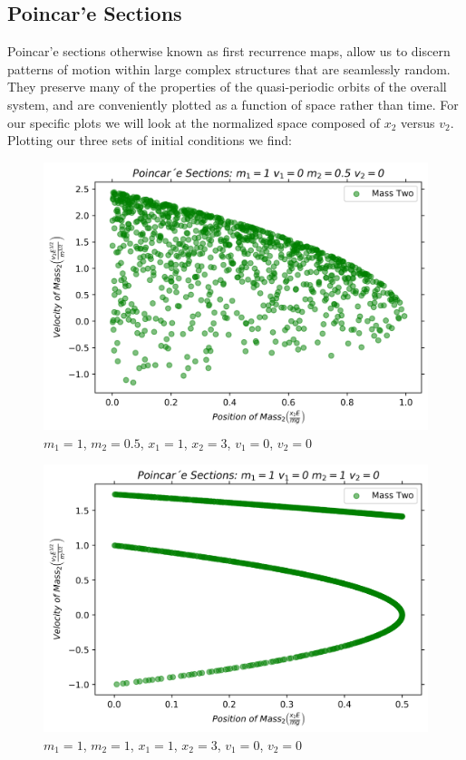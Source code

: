 \documentclass[twocolumn]{article}
\begin{document}
\subsection{Poincar'e Sections}
\hspace{\parindent}Poincar'e sections otherwise known as first recurrence maps, allow us to discern patterns of motion within large complex structures that are seamlessly random. They preserve many of the properties of the quasi-periodic orbits of the overall system, and are conveniently plotted as a function of space rather than time. For our specific plots we will look at the normalized space composed of $x_2$ versus $v_2$. Plotting our three sets of initial conditions we find: \\
\begin{figure}[h]
\caption{$m_1=1$, $m_2=0.5$, $x_1=1$, $x_2=3$, $v_1=0$, $v_2=0$}
\centering
\includegraphics[scale=.45]{Section-IC1-Scatter}
\end{figure} 
\begin{figure}[h]
\caption{$m_1=1$, $m_2=1$, $x_1=1$, $x_2=3$, $v_1=0$, $v_2=0$}
\centering
\includegraphics[scale=.45]{Section-IC2-Scatter}
\end{figure}
\end{document}
